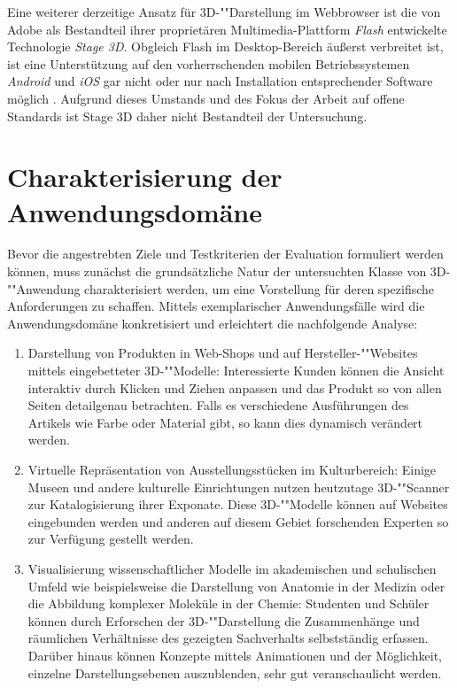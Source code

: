 Eine weiterer derzeitige Ansatz für 3D-""Darstellung im Webbrowser ist die von Adobe als Bestandteil ihrer proprietären Multimedia-Plattform \emph{Flash} entwickelte Technologie \emph{Stage 3D}. Obgleich Flash im Desktop-Bereich äußerst verbreitet ist, ist eine Unterstützung auf den vorherrschenden mobilen Betriebssystemen \emph{Android} und \emph{iOS} gar nicht oder nur nach Installation entsprechender Software möglich \autocite{Evans201443}. Aufgrund dieses Umstands und des Fokus der Arbeit auf offene Standards ist Stage 3D daher nicht Bestandteil der Untersuchung.

\section{Charakterisierung der Anwendungsdomäne}
\label{SEC:APPLICATION_DOMAIN}

Bevor die angestrebten Ziele und Testkriterien der Evaluation formuliert werden können, muss zunächst die grundsätzliche Natur der untersuchten Klasse von 3D-""Anwendung charakterisiert werden, um eine Vorstellung für deren spezifische Anforderungen zu schaffen. Mittels exemplarischer Anwendungsfälle wird die Anwendungsdomäne konkretisiert und erleichtert die nachfolgende Analyse:

\begin{enumerate}[noitemsep]
	\item Darstellung von Produkten in Web-Shops und auf Hersteller-""Websites mittels eingebetteter 3D-""Modelle: Interessierte Kunden können die Ansicht interaktiv durch Klicken und Ziehen anpassen und das Produkt so von allen Seiten detailgenau betrachten. Falls es verschiedene Ausführungen des Artikels wie Farbe oder Material gibt, so kann dies dynamisch verändert werden.
	\item Virtuelle Repräsentation von Ausstellungsstücken im Kulturbereich: Einige Museen und andere kulturelle Einrichtungen nutzen heutzutage 3D-""Scanner zur Katalogisierung ihrer Exponate. Diese 3D-""Modelle können auf Websites eingebunden werden und anderen auf diesem Gebiet forschenden Experten so zur Verfügung gestellt werden.
	\item Visualisierung wissenschaftlicher Modelle im akademischen und schulischen Umfeld wie beispielsweise die Darstellung von Anatomie in der Medizin oder die Abbildung komplexer Moleküle in der Chemie: Studenten und Schüler können durch Erforschen der 3D-""Darstellung die Zusammenhänge und räumlichen Verhältnisse des gezeigten Sachverhalts selbstständig erfassen. Darüber hinaus können Konzepte mittels Animationen und der Möglichkeit, einzelne Darstellungsebenen auszublenden, sehr gut veranschaulicht werden.
\end{enumerate}

